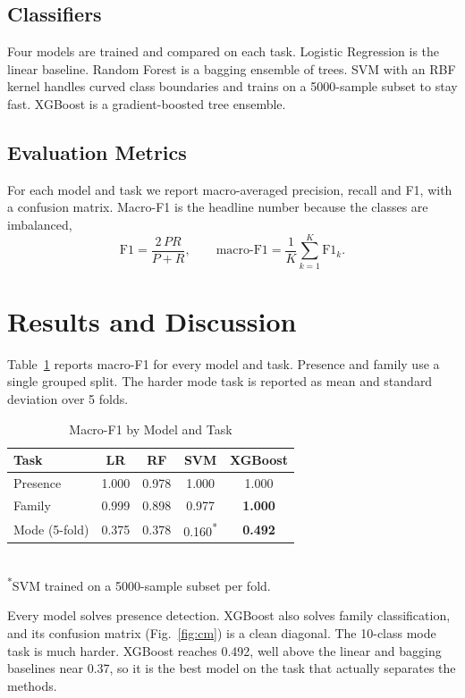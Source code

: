 \documentclass[11pt,conference,a4paper]{IEEEtran}
\begin{document}
\subsection{Classifiers}
Four models are trained and compared on each task. Logistic Regression is the
linear baseline. Random Forest is a bagging ensemble of trees. SVM with an RBF
kernel handles curved class boundaries and trains on a 5000-sample subset to
stay fast. XGBoost is a gradient-boosted tree ensemble.

\subsection{Evaluation Metrics}
For each model and task we report macro-averaged precision, recall and F1, with
a confusion matrix. Macro-F1 is the headline number because the classes are
imbalanced,
\[
\text{F1} = \frac{2\,PR}{P+R},\qquad
\text{macro-F1} = \frac{1}{K}\sum_{k=1}^{K}\text{F1}_k .
\]

\section{Results and Discussion}
Table~\ref{tab:results} reports macro-F1 for every model and task. Presence and
family use a single grouped split. The harder mode task is reported as mean and
standard deviation over 5 folds.

\begin{table}[t]
\centering
\caption{Macro-F1 by Model and Task}
\label{tab:results}
\small
\begin{tabular}{|l|c|c|c|c|}
\hline
\textbf{Task} & \textbf{LR} & \textbf{RF} & \textbf{SVM} & \textbf{XGBoost} \\
\hline
Presence & 1.000 & 0.978 & 1.000 & 1.000 \\
\hline
Family & 0.999 & 0.898 & 0.977 & \textbf{1.000} \\
\hline
Mode (5-fold) & 0.375 & 0.378 & 0.160\textsuperscript{*} & \textbf{0.492} \\
\hline
\end{tabular}
\\[3pt]
\footnotesize\textsuperscript{*}SVM trained on a 5000-sample subset per fold.
\end{table}

Every model solves presence detection. XGBoost also solves family
classification, and its confusion matrix (Fig.~\ref{fig:cm}) is a clean
diagonal. The 10-class mode task is much harder. XGBoost reaches 0.492, well
above the linear and bagging baselines near 0.37, so it is the best model on the
task that actually separates the methods.
\end{document}
